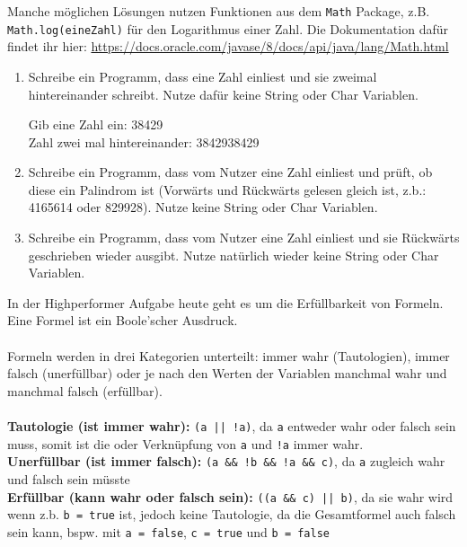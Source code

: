 \documentclass{../../sheet}
\begin{document}
Manche möglichen Lösungen nutzen Funktionen aus dem \texttt{Math} Package, z.B. \texttt{Math.log(eineZahl)} für den Logarithmus einer Zahl. Die Dokumentation dafür findet ihr hier: \url{https://docs.oracle.com/javase/8/docs/api/java/lang/Math.html}
\begin{enumerate}
    \item Schreibe ein Programm, dass eine Zahl einliest und sie zweimal hintereinander schreibt. Nutze dafür keine String oder Char Variablen.
    \begin{ausgabe}
Gib eine Zahl ein: 38429\\
Zahl zwei mal hintereinander: 3842938429
    \end{ausgabe}
    \item Schreibe ein Programm, dass vom Nutzer eine Zahl einliest und prüft, ob diese ein Palindrom ist (Vorwärts und Rückwärts gelesen gleich ist, z.b.: 4165614 oder 829928). Nutze keine String oder Char Variablen.
    \item Schreibe ein Programm, dass vom Nutzer eine Zahl einliest und sie Rückwärts geschrieben wieder ausgibt. Nutze natürlich wieder keine String oder Char Variablen.
\end{enumerate}

\newpage
{}
In der Highperformer Aufgabe heute geht es um die Erfüllbarkeit von Formeln. Eine Formel ist ein Boole'scher Ausdruck.
\\\\
Formeln werden in drei Kategorien unterteilt: immer wahr (Tautologien), immer falsch (unerfüllbar) oder je nach den Werten der Variablen manchmal wahr und manchmal falsch (erfüllbar).
\\\\
\textbf{Tautologie (ist immer wahr): } \texttt{(a || !a)}, da \texttt{a} entweder wahr oder falsch sein muss, somit ist die oder Verknüpfung von \texttt{a} und \texttt{!a} immer wahr.\\
\textbf{Unerfüllbar (ist immer falsch): } \texttt{(a \&\& !b \&\& !a \&\& c)}, da \texttt{a} zugleich wahr und falsch sein müsste\\
\textbf{Erfüllbar (kann wahr oder falsch sein): } \texttt{((a \&\& c) || b)}, da sie wahr wird wenn z.b. \texttt{b = true} ist, jedoch keine Tautologie, da die Gesamtformel auch falsch sein kann, bspw. mit \texttt{a = false}, \texttt{c = true} und \texttt{b = false}
\end{document}
